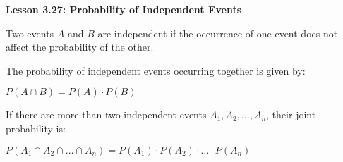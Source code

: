 \begin{center}
\textbf{Lesson 3.27: Probability of Independent Events}
\end{center}

\vspace*{-1.5ex}

\noindent Two events \( A \) and \( B \) are independent if the occurrence of one event does not affect the probability of the other.

\noindent The probability of independent events occurring together is given by:

{\centering $ P(A \cap B) = P(A) \cdot P(B) $\par}

\noindent If there are more than two independent events \( A_1, A_2, \ldots, A_n \), their joint probability is:

{\centering $ P(A_1 \cap A_2 \cap \ldots \cap A_n) = P(A_1) \cdot P(A_2) \cdot \ldots \cdot P(A_n)$\par}



